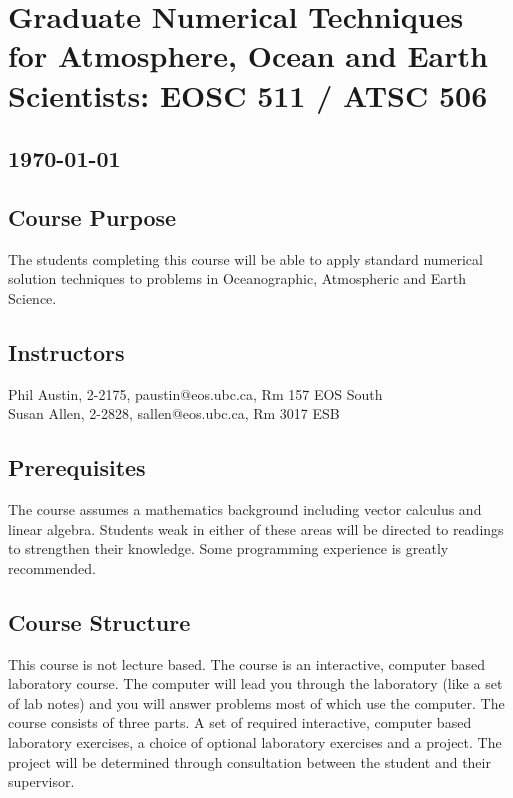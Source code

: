\documentclass[10pt]{article}
\begin{document}
\section*{Graduate Numerical Techniques for Atmosphere, Ocean and Earth Scientists: EOSC 511 / ATSC 506}
\subsection*{\center\today}

\subsection*{Course Purpose}

The students completing this course will be able to apply standard numerical solution techniques to problems in Oceanographic, Atmospheric and Earth Science. 

\subsection*{Instructors}

       Phil Austin, 2-2175, paustin@eos.ubc.ca, Rm 157 EOS South \\
       Susan Allen, 2-2828, sallen@eos.ubc.ca, Rm 3017 ESB


\subsection*{Prerequisites}

The course assumes a mathematics background including vector calculus and linear algebra.
Students weak in either of these areas will be directed to readings to strengthen their knowledge.  Some programming experience is greatly recommended.


\subsection*{Course Structure}

This course is not lecture based. The course is an interactive, computer based laboratory course. The computer will lead you through the laboratory (like a set of lab notes) and you will answer problems most of which use the computer. The course consists of three parts. A set of required interactive, computer based
laboratory exercises, a choice of optional laboratory exercises and a project. The project will be determined through consultation between the
student and their supervisor. 
\end{document}
